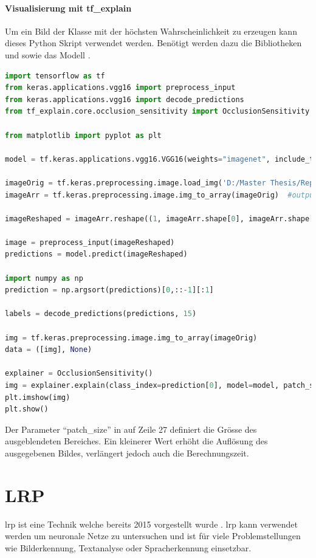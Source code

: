 \documentclass[
  12pt, %
  a4paper, %
  oneside, %
  openany, 
  numbers=noenddot, %
  BCOR=5mm, %
  parskip=half*, %
  thesis, %
]{bfhbook}
\begin{document}
\paragraph*{Visualisierung mit tf\_explain}
\break
Um ein Bild der Klasse mit der höchsten Wahrscheinlichkeit zu erzeugen kann dieses Python Skript verwendet werden. Benötigt werden dazu die Bibliotheken \parencite{TensorFlow} und  \parencite{tfExplain} sowie das Modell \parencite{vgg16}.
\begin{lstlisting}[language=Python, caption=Occlusion Sensitivity Visualisierung für die wahrscheinlichste Klasse]
import tensorflow as tf
from keras.applications.vgg16 import preprocess_input
from keras.applications.vgg16 import decode_predictions
from tf_explain.core.occlusion_sensitivity import OcclusionSensitivity

from matplotlib import pyplot as plt

model = tf.keras.applications.vgg16.VGG16(weights="imagenet", include_top=True)

imageOrig = tf.keras.preprocessing.image.load_img('D:/Master Thesis/Repo/Test Images/tabby.2.JPG', target_size=(224, 224))
imageArr = tf.keras.preprocessing.image.img_to_array(imageOrig)  #output Numpy-array

imageReshaped = imageArr.reshape((1, imageArr.shape[0], imageArr.shape[1], imageArr.shape[2]))

image = preprocess_input(imageReshaped)
predictions = model.predict(imageReshaped)

import numpy as np
prediction = np.argsort(predictions)[0,::-1][:1]

labels = decode_predictions(predictions, 15)

img = tf.keras.preprocessing.image.img_to_array(imageOrig)
data = ([img], None)
    
explainer = OcclusionSensitivity()
img = explainer.explain(class_index=prediction[0], model=model, patch_size= 40, validation_data=data)
plt.imshow(img)
plt.show()
\end{lstlisting}
Der Parameter ``patch\_size'' in auf Zeile 27 definiert die Grösse des ausgeblendeten Bereiches. Ein kleinerer Wert erhöht die Auflösung des ausgegebenen Bildes, verlängert jedoch auch die Berechnungszeit.

\section{LRP}
\label{lrp}

\acrfull{lrp} ist eine Technik welche bereits 2015 vorgestellt wurde \parencite{Bach2015}. \acrshort{lrp} kann verwendet werden um neuronale Netze zu untersuchen und  ist für viele Problemstellungen wie Bilderkennung, Textanalyse oder Spracherkennung einsetzbar. 
\end{document}

